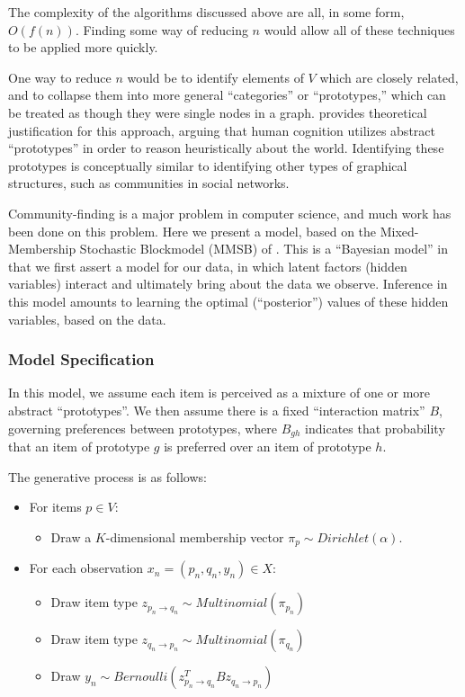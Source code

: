 The complexity of the algorithms discussed above are all, in some form, $O(f(n))$.
Finding some way of reducing $n$ would allow all of these techniques to be applied more quickly.

\bigskip

One way to reduce $n$ would be to identify elements of $V$ which are closely related, and to collapse them into more general ``categories'' or ``prototypes,'' which can be treated as though they were single nodes in a graph.
\cite{rosch:1973} provides theoretical justification for this approach, arguing that human cognition utilizes abstract ``prototypes'' in order to reason heuristically about the world.
Identifying these prototypes is conceptually similar to identifying other types of graphical structures, such as communities in social networks.

Community-finding is a major problem in computer science, and much work has been done on this problem.
Here we present a model, based on the Mixed-Membership Stochastic Blockmodel (MMSB) of \cite{airoldi:2008}.
This is a ``Bayesian model'' in that we first assert a model for our data, in which latent factors (hidden variables) interact and ultimately bring about the data we observe.
Inference in this model amounts to learning the optimal (``posterior'') values of these hidden variables, based on the data.


\subsubsection{Model Specification}

In this model, we assume each item is perceived as a mixture of one or more abstract ``prototypes''.
We then assume there is a fixed ``interaction matrix'' $B$, governing preferences between prototypes, where $B_{gh}$ indicates that probability that an item of prototype $g$ is preferred over an item of prototype $h$.

\bigskip

The generative process is as follows:
\begin{itemize}
	\item For items $p \in V$:
	\begin{itemize}
		\item Draw a $K$-dimensional membership vector $\pi_p \sim Dirichlet(\alpha)$.
	\end{itemize}
	\item For each observation $x_n = (p_n, q_n, y_n) \in X$:
	\begin{itemize}
		\item Draw item type $z_{p_n \rightarrow q_n} \sim Multinomial(\pi_{p_n})$
		\item Draw item type $z_{q_n \rightarrow p_n} \sim Multinomial(\pi_{q_n})$
		\item Draw $y_n \sim Bernoulli(z_{p_n \rightarrow q_n}^TBz_{q_n \rightarrow p_n})$
	\end{itemize}
\end{itemize}


